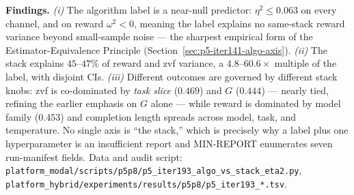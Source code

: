 \textbf{Findings.} \textit{(i)} The algorithm label is a near-null predictor:
$\eta^2 \le 0.063$ on every channel, and on reward $\omega^2 < 0$, meaning the
label explains no same-stack reward variance beyond small-sample noise --- the
sharpest empirical form of the Estimator-Equivalence Principle
(Section~\ref{sec:p5-iter141-algo-axis}). \textit{(ii)} The stack explains
$45$--$47\%$ of reward and zvf variance, a $4.8$--$60.6\times$ multiple of the
label, with disjoint CIs. \textit{(iii)} Different outcomes are governed by
different stack knobs: zvf is co-dominated by \emph{task slice}
($0.469$) and $G$ ($0.444$) --- nearly tied, refining the earlier emphasis on
$G$ alone --- while reward is dominated by model family ($0.453$) and
completion length spreads across model, task, and temperature. No single axis is
``the stack,'' which is precisely why a label plus one hyperparameter is an
insufficient report and MIN-REPORT enumerates seven run-manifest fields. Data and audit
script: \texttt{platform_modal/scripts/p5p8/p5\_iter193\_algo\_vs\_stack\_eta2.py},
\texttt{platform_hybrid/experiments/results/p5p8/p5\_iter193\_*.tsv}.
